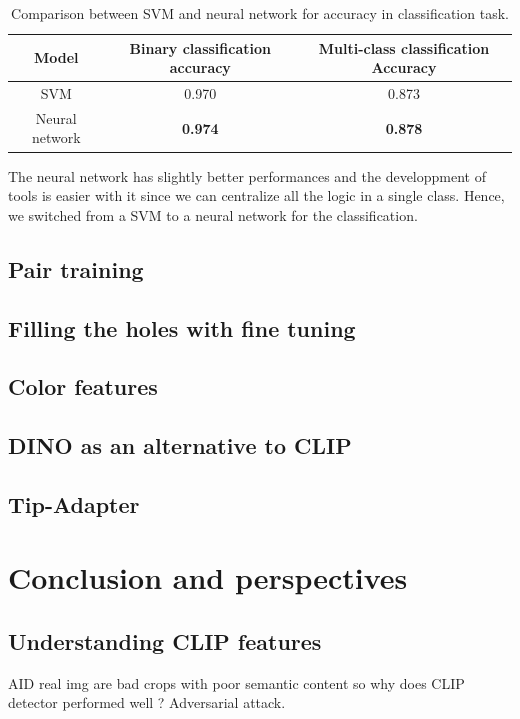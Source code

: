 \documentclass[12pt,a4paper]{article}
\begin{document}
\begin{table}[H]
    \centering
    \begin{tabular}{|c|c|c|}
        \hline
        Model & Binary classification accuracy & Multi-class classification Accuracy\\
        \hline
        SVM & 0.970 & 0.873\\
        \hline
        Neural network & \textbf{0.974} & \textbf{0.878}\\
        \hline
    \end{tabular}
    \caption{Comparison between SVM and neural network for accuracy in classification task.}
    \label{table:svmVsNN}
\end{table}

The neural network has slightly better performances and the developpment of tools is easier with it since we can centralize all the logic in a single class. Hence, we switched from a SVM to a neural network for the classification.\\





\subsection{Pair training}
\subsection{Filling the holes with fine tuning}

\subsection{Color features}

\subsection{DINO as an alternative to CLIP}
\autocite*{oquabDINOv2LearningRobust2024}

\subsection{Tip-Adapter}
\autocite*{khanCLIPpingDeceptionAdapting2024}
\autocite*{zhangTipAdapterTrainingfreeAdaption2022}


\section{Conclusion and perspectives}
\subsection{Understanding CLIP features}
AID real img are bad crops with poor semantic content so why does CLIP detector performed well ?
Adversarial attack.

\newpage
\printbibliography
\end{document}
